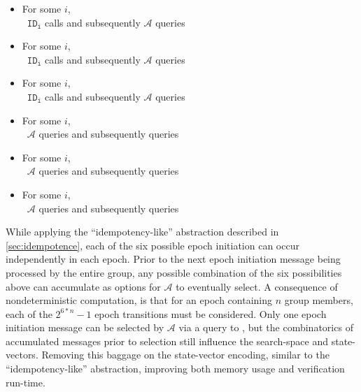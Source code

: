 \begin{itemize}
  \item For some \(i\),\\~\hspace{4em}\(\mathtt{ID_i}\) calls  and subsequently \(\mathcal{A}\) queries 
  \item For some \(i\),\\~\hspace{4em}\(\mathtt{ID_i}\) calls  and subsequently \(\mathcal{A}\) queries 
  \item For some \(i\),\\~\hspace{4em}\(\mathtt{ID_i}\) calls  and subsequently \(\mathcal{A}\) queries 
  \item For some \(i\),\\~\hspace{4em}\(\mathcal{A}\) queries     and subsequently queries 
  \item For some \(i\),\\~\hspace{4em}\(\mathcal{A}\) queries  and subsequently queries 
  \item For some \(i\),\\~\hspace{4em}\(\mathcal{A}\) queries  and subsequently queries 
\end{itemize}

While applying the ``idempotency-like'' abstraction described in \ref{sec:idempotence}, each of the six possible epoch initiation can occur independently in each epoch.
Prior to the next epoch initiation message being processed by the entire group, any possible combination of the six possibilities above can accumulate as options for \(\mathcal{A}\) to eventually select.
A consequence of nondeterministic computation, is that for an epoch containing \(n\) group members, each of the \(2^{6*n} - 1\) epoch transitions must be considered.
Only one epoch initiation message can be selected by \(\mathcal{A}\) via a query to , but the combinatorics of accumulated messages prior to selection still influence the search-space and state-vectors.
Removing this baggage on the state-vector encoding, similar to the ``idempotency-like'' abstraction, improving both memory usage and verification run-time.

